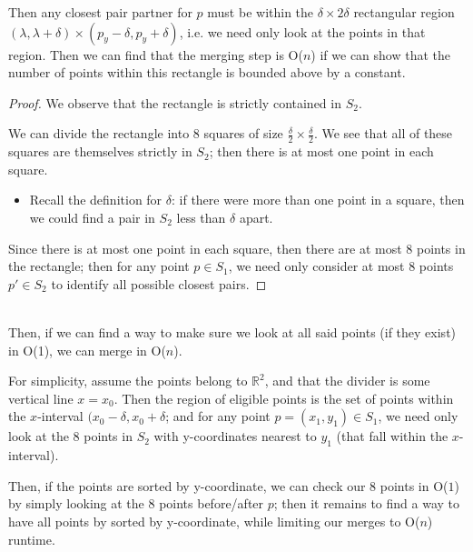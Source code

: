 \documentclass[12pt]{extarticle}
\theoremstyle{definition}
\theoremstyle{remark}
\begin{document}
Then any closest pair partner for $p$ must be within the $\delta\times 2\delta$ rectangular region $(\lambda,\lambda+\delta)\times(p_y-\delta,p_y+\delta)$, i.e. we need only look at the points in that region. Then we can find that the merging step is O($n$) if we can show that the number of points within this rectangle is bounded above by a constant.

\begin{proof}
    We observe that the rectangle is strictly contained in $S_2$.
    
    We can divide the rectangle into 8 squares of size $\frac{\delta}{2}\times\frac{\delta}{2}$. We see that all of these squares are themselves strictly in $S_2$; then there is at most one point in each square. \begin{itemize}
        \item Recall the definition for $\delta$: if there were more than one point in a square, then we could find a pair in $S_2$ less than $\delta$ apart.
    \end{itemize}

    Since there is at most one point in each square, then there are at most 8 points in the rectangle; then for any point $p\in S_1$, we need only consider at most 8 points $p'\in S_2$ to identify all possible closest pairs. 
\end{proof}

~\\
\noindent Then, if we can find a way to make sure we look at all said points (if they exist) in O(1), we can merge in O($n$).

For simplicity, assume the points belong to $\mathbb{R}^2$, and that the divider is some vertical line $x=x_0$. Then the region of eligible points is the set of points within the $x$-interval $(x_0-\delta,x_0+\delta$; and for any point $p=(x_1,y_1)\in S_1$, we need only look at the 8 points in $S_2$ with y-coordinates nearest to $y_1$ (that fall within the $x$-interval).

\begin{center}
\end{center}

Then, if the points are sorted by y-coordinate, we can check our 8 points in O($1$) by simply looking at the 8 points before/after $p$; then it remains to find a way to have all points by sorted by y-coordinate, while limiting our merges to O($n$) runtime.
\end{document}
